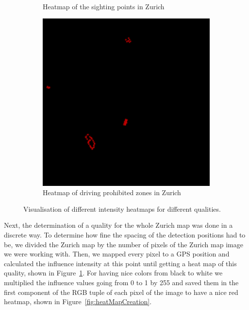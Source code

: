 \documentclass[letterpaper]{article}
\begin{document}
\begin{figure}[H]
\begin{subfigure}[t]{.45\columnwidth}
        \caption[width=.9\linewidth]{Heatmap of the sighting points in Zurich}
    \end{subfigure}\vspace{1mm}
    \begin{subfigure}[t]{.45\columnwidth}
        \centering
        \includegraphics[width=\linewidth]{images/results/driving_prohibited_heatmap_70.png}
        \caption[width=.9\linewidth]{Heatmap of driving prohibited zones in Zurich}
    \end{subfigure}\hspace{0.05\columnwidth}
    \caption{Visualisation of different intensity heatmaps for different qualities.}
    \label{fig:ZurichSingleHeatmaps}
\end{figure}

\indent Next, the determination of a quality for the whole Zurich map was done in a discrete way.
To determine how fine the spacing of the detection positions had to be, we divided the Zurich map
by the number of pixels of the Zurich map image we were working with. Then, we mapped every pixel
to a GPS position and calculated the influence intensity at this point until getting a heat map
of this quality, shown in Figure~\ref{fig:ZurichSingleHeatmaps}. For having nice colors from black
to white we multiplied the influence values going from 0 to 1 by 255 and saved them in the first component
of the RGB tuple of each pixel of the image to have a nice red heatmap, shown in Figure~\ref{fig:heatMapCreation}.
\end{document}
